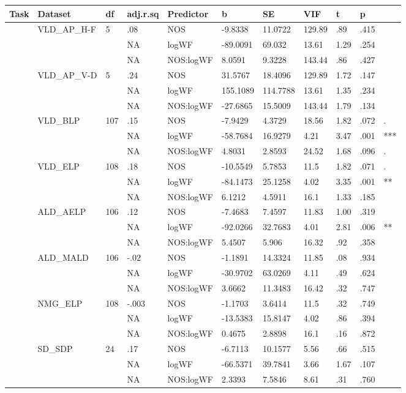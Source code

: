 \begin{table}[ht]
\centering
\begingroup\normalsize
\begin{tabular}{lllllllllll}
  \hline
Task & Dataset & df & adj.r.sq & Predictor & b & SE & VIF & t & p &  \\ 
  \hline
 & VLD\_AP\_H-F & 5 & .08 & NOS & -9.8338 & 11.0722 & 129.89 & .89 & .415 &   \\ 
   &  &  & NA & logWF & -89.0091 & 69.032 & 13.61 & 1.29 & .254 &   \\ 
   &  &  & NA & NOS:logWF & 8.0591 & 9.3228 & 143.44 & .86 & .427 &   \\ 
   & VLD\_AP\_V-D & 5 & .24 & NOS & 31.5767 & 18.4096 & 129.89 & 1.72 & .147 &   \\ 
   &  &  & NA & logWF & 155.1089 & 114.7788 & 13.61 & 1.35 & .234 &   \\ 
   &  &  & NA & NOS:logWF & -27.6865 & 15.5009 & 143.44 & 1.79 & .134 &   \\ 
   & VLD\_BLP & 107 & .15 & NOS & -7.9429 & 4.3729 & 18.56 & 1.82 & .072 & . \\ 
   &  &  & NA & logWF & -58.7684 & 16.9279 & 4.21 & 3.47 & .001 & *** \\ 
   &  &  & NA & NOS:logWF & 4.8031 & 2.8593 & 24.52 & 1.68 & .096 & . \\ 
   & VLD\_ELP & 108 & .18 & NOS & -10.5549 & 5.7853 & 11.5 & 1.82 & .071 & . \\ 
   &  &  & NA & logWF & -84.1473 & 25.1258 & 4.02 & 3.35 & .001 & ** \\ 
   &  &  & NA & NOS:logWF & 6.1212 & 4.5911 & 16.1 & 1.33 & .185 &   \\ 
   & ALD\_AELP & 106 & .12 & NOS & -7.4683 & 7.4597 & 11.83 & 1.00 & .319 &   \\ 
   &  &  & NA & logWF & -92.0266 & 32.7683 & 4.01 & 2.81 & .006 & ** \\ 
   &  &  & NA & NOS:logWF & 5.4507 & 5.906 & 16.32 & .92 & .358 &   \\ 
   & ALD\_MALD & 106 & -.02 & NOS & -1.1891 & 14.3324 & 11.85 & .08 & .934 &   \\ 
   &  &  & NA & logWF & -30.9702 & 63.0269 & 4.11 & .49 & .624 &   \\ 
   &  &  & NA & NOS:logWF & 3.6662 & 11.3483 & 16.42 & .32 & .747 &   \\ 
   & NMG\_ELP & 108 & -.003 & NOS & -1.1703 & 3.6414 & 11.5 & .32 & .749 &   \\ 
   &  &  & NA & logWF & -13.5383 & 15.8147 & 4.02 & .86 & .394 &   \\ 
   &  &  & NA & NOS:logWF & 0.4675 & 2.8898 & 16.1 & .16 & .872 &   \\ 
   & SD\_SDP & 24 & .17 & NOS & -6.7113 & 10.1577 & 5.56 & .66 & .515 &   \\ 
   &  &  & NA & logWF & -66.5371 & 39.7841 & 3.66 & 1.67 & .107 &   \\ 
   &  &  & NA & NOS:logWF & 2.3393 & 7.5846 & 8.61 & .31 & .760 &   \\ 
   \hline
\end{tabular}
\endgroup
\end{table}
